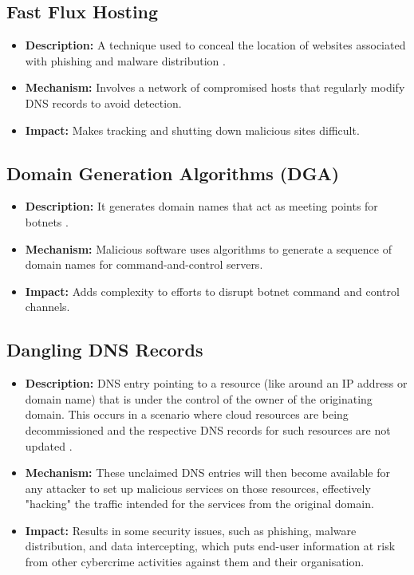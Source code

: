 \subsection{Fast Flux Hosting}
\begin{itemize}
    \item \textbf{Description:} A technique used to conceal the location of websites associated with phishing and malware distribution \cite{lin2013genetic}.
    \item \textbf{Mechanism:} Involves a network of compromised hosts that regularly modify DNS records to avoid detection.
    \item \textbf{Impact:} Makes tracking and shutting down malicious sites difficult.
\end{itemize}

\subsection{Domain Generation Algorithms (DGA)}
\begin{itemize}
    \item \textbf{Description:} It generates domain names that act as meeting points for botnets \cite{antonakakis2012throw}.
    \item \textbf{Mechanism:} Malicious software uses algorithms to generate a sequence of domain names for command-and-control servers.
    \item \textbf{Impact:} Adds complexity to efforts to disrupt botnet command and control channels.
\end{itemize}

    
\subsection{Dangling DNS Records}
\begin{itemize}
    \item \textbf{Description:}  DNS entry pointing to a resource (like around an IP address or domain name) that is under the control of the owner of the originating domain. This occurs in a scenario where cloud resources are being decommissioned and the respective DNS records for such resources are not updated \cite{friess2024cloudy}.
    \item \textbf{Mechanism:} These unclaimed DNS entries will then become available for any attacker to set up malicious services on those resources, effectively "hacking" the traffic intended for the services from the original domain.
    \item \textbf{Impact:} Results in some security issues, such as phishing, malware distribution, and data intercepting, which puts end-user information at risk from other cybercrime activities against them and their organisation.
\end{itemize}



